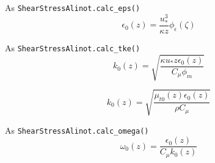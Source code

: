 \documentclass{article}
\begin{document}
As \texttt{ShearStressAlinot.calc\_eps()}
\begin{equation}
  \epsilon_0(z) = \frac{u_*^3}{\kappa z} \phi_\epsilon(\zeta)
\end{equation}

As \texttt{ShearStressAlinot.calc\_tke()}
\begin{equation}
  k_0(z) = \sqrt{\frac{\kappa u_* z \epsilon_0(z)}{C_\mu \phi_m}}
\end{equation}

\begin{equation}
  k_0(z) = \sqrt{\frac{\mu_{t0}(z)\epsilon_0(z)}{\rho C_\mu}}
\end{equation}


As \texttt{ShearStressAlinot.calc\_omega()}
\begin{equation}
  \omega_0(z) = \frac{\epsilon_0(z)}{C_\mu k_0(z)}
\end{equation}



\end{document}
